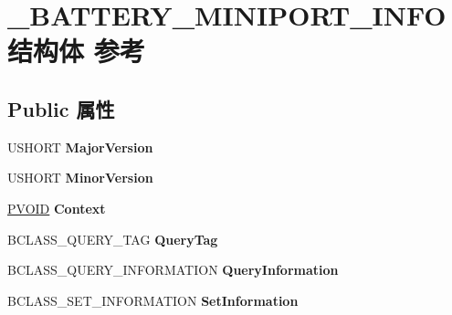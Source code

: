 \hypertarget{struct___b_a_t_t_e_r_y___m_i_n_i_p_o_r_t___i_n_f_o}{}\section{\+\_\+\+B\+A\+T\+T\+E\+R\+Y\+\_\+\+M\+I\+N\+I\+P\+O\+R\+T\+\_\+\+I\+N\+F\+O结构体 参考}
\label{struct___b_a_t_t_e_r_y___m_i_n_i_p_o_r_t___i_n_f_o}
\subsection*{Public 属性}
\begin{DoxyCompactItemize}
\item 
\mbox{\label{struct___b_a_t_t_e_r_y___m_i_n_i_p_o_r_t___i_n_f_o_aa3dc3e210dca983953bc030ec19c2517}} 
U\+S\+H\+O\+RT {\bfseries Major\+Version}
\item 
\mbox{\label{struct___b_a_t_t_e_r_y___m_i_n_i_p_o_r_t___i_n_f_o_a8a838f11f04747c5de0c6ec53ea252d7}} 
U\+S\+H\+O\+RT {\bfseries Minor\+Version}
\item 
\mbox{\label{struct___b_a_t_t_e_r_y___m_i_n_i_p_o_r_t___i_n_f_o_a80ba9915d4ddfffd9136ef4749757626}} 
\hyperlink{interfacevoid}{P\+V\+O\+ID} {\bfseries Context}
\item 
\mbox{\label{struct___b_a_t_t_e_r_y___m_i_n_i_p_o_r_t___i_n_f_o_af59a747a33ffc91bb8916ed87da26aab}} 
B\+C\+L\+A\+S\+S\+\_\+\+Q\+U\+E\+R\+Y\+\_\+\+T\+AG {\bfseries Query\+Tag}
\item 
\mbox{\label{struct___b_a_t_t_e_r_y___m_i_n_i_p_o_r_t___i_n_f_o_a1681d3e263383d1a9cd36692cb4bfd09}} 
B\+C\+L\+A\+S\+S\+\_\+\+Q\+U\+E\+R\+Y\+\_\+\+I\+N\+F\+O\+R\+M\+A\+T\+I\+ON {\bfseries Query\+Information}
\item 
\mbox{\label{struct___b_a_t_t_e_r_y___m_i_n_i_p_o_r_t___i_n_f_o_ad486e4e6a2aac8555cc11b2b273775f7}} 
B\+C\+L\+A\+S\+S\+\_\+\+S\+E\+T\+\_\+\+I\+N\+F\+O\+R\+M\+A\+T\+I\+ON {\bfseries Set\+Information}

\end{DoxyCompactItemize}
